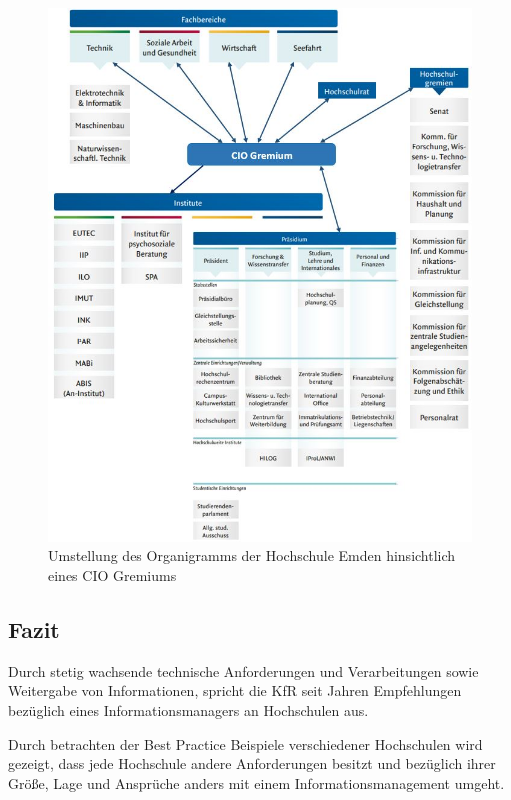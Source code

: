 \begin{figure}[h!]
	\centering
	\includegraphics[width=\textwidth]
	{kapitel/gruppe3/bilder/konzept_organigramm_mit_CIO}
	\caption{Umstellung des Organigramms der Hochschule Emden hinsichtlich eines CIO Gremiums}
	\label{fig_konzept_organigramm_mit_CIO}
\end{figure}

\newpage

\subsection{Fazit}
Durch stetig wachsende technische Anforderungen und Verarbeitungen 
sowie Weitergabe von Informationen, spricht die KfR seit Jahren 
Empfehlungen bezüglich eines Informationsmanagers an Hochschulen aus. 

Durch betrachten der Best Practice Beispiele verschiedener Hochschulen wird gezeigt, 
dass jede Hochschule andere Anforderungen besitzt und bezüglich ihrer Größe, Lage und 
Ansprüche anders mit einem Informationsmanagement umgeht.


